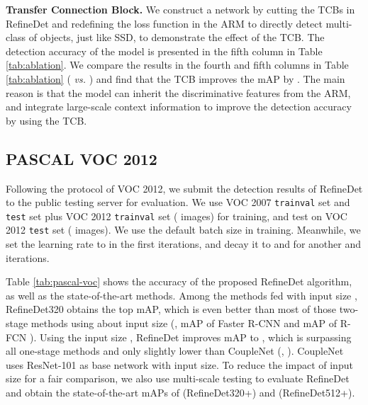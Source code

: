 \documentclass[10pt,twocolumn,letterpaper]{article}
\begin{document}
{\flushleft \textbf{Transfer Connection Block.}} We construct a network by cutting the TCBs in RefineDet and redefining the loss function in the ARM to directly detect multi-class of objects, just like SSD, to demonstrate the effect of the TCB. The detection accuracy of the model is presented in the fifth column in Table \ref{tab:ablation}. We compare the results in the fourth and fifth columns in Table \ref{tab:ablation} ( {\it vs.} ) and find that the TCB improves the mAP by . The main reason is that the model can inherit the discriminative features from the ARM, and integrate large-scale context information to improve the detection accuracy by using the TCB.



\subsection{PASCAL VOC 2012}
Following the protocol of VOC 2012, we submit the detection results of RefineDet to the public testing server for evaluation. We use VOC 2007 {\tt trainval} set and {\tt test} set plus VOC 2012 {\tt trainval} set ( images) for training, and test on VOC 2012 {\tt test} set ( images). We use the default batch size  in training. Meanwhile, we set the learning rate to  in the first  iterations, and decay it to  and  for another  and  iterations.

Table \ref{tab:pascal-voc} shows the accuracy of the proposed RefineDet algorithm, as well as the state-of-the-art methods. Among the methods fed with input size , RefineDet320 obtains the top  mAP, which is even better than most of those two-stage methods using about  input size (\eg,  mAP of Faster R-CNN \cite{DBLP:journals/pami/RenHG017} and  mAP of R-FCN \cite{DBLP:conf/nips/DaiLHS16}). Using the input size , RefineDet improves mAP to , which is surpassing all one-stage methods and only slightly lower than CoupleNet \cite{DBLP:conf/iccv/abs-1708-02863} (\ie, ). CoupleNet uses ResNet-101 as base network with  input size. To reduce the impact of input size for a fair comparison, we also use multi-scale testing to evaluate RefineDet and obtain the state-of-the-art mAPs of  (RefineDet320+) and  (RefineDet512+).
\end{document}
